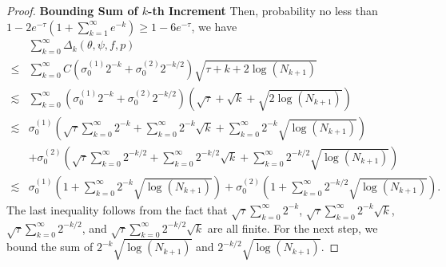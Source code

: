 \documentclass[12pt]{article}
\begin{document}
\begin{proof}
\noindent\textbf{Bounding Sum of $k$-th Increment}
Then, probability no less than $1-2e^{-\tau}(1+\sum_{k=1}^\infty e^{-k})\geq 1- 6e^{-\tau}$, we have 
\begin{align}
    &\sum_{k=0}^\infty \Delta_k(\theta,\psi,f,p)\nonumber\\
    \leq & \sum_{k=0}^\infty C(\sigma_0^{(1)}2^{-k} + \sigma_0^{(2)}2^{-k/2})\sqrt{\tau + k +2\log(N_{k+1})}\nonumber\\
    \lesssim & \sum_{k=0}^\infty (\sigma_0^{(1)}2^{-k} + \sigma_0^{(2)}2^{-k/2})\left(\sqrt{\tau} + \sqrt{k}+\sqrt{2\log(N_{k+1})}\right)\nonumber\\
    \lesssim & \sigma_0^{(1)}\left(\sqrt{\tau}\sum_{k=0}^\infty 2^{-k} + \sum_{k=0}^\infty 2^{-k}\sqrt{k}+ \sum_{k=0}^\infty 2^{-k}\sqrt{\log(N_{k+1})}\right)\nonumber\\
    &+ \sigma_0^{(2)}\left(\sqrt{\tau}\sum_{k=0}^\infty 2^{-k/2} + \sum_{k=0}^\infty 2^{-k/2}\sqrt{k}+ \sum_{k=0}^\infty 2^{-k/2}\sqrt{\log(N_{k+1})}\right)\nonumber\\
    \lesssim & \sigma_0^{(1)}\left(1+ \sum_{k=0}^\infty 2^{-k}\sqrt{\log(N_{k+1})}\right)+ \sigma_0^{(2)}\left(1+ \sum_{k=0}^\infty 2^{-k/2}\sqrt{\log(N_{k+1})}\right)\label{eq:sum_of_k_increment}.
\end{align}
The last inequality follows from the fact that $\sqrt{\tau}\sum_{k=0}^\infty 2^{-k}$, $\sqrt{\tau}\sum_{k=0}^\infty 2^{-k}\sqrt{k}$, $\sqrt{\tau}\sum_{k=0}^\infty 2^{-k/2}$, and $\sqrt{\tau}\sum_{k=0}^\infty 2^{-k/2}\sqrt{k}$ are all finite. For the next step, we bound the sum of $2^{-k}\sqrt{\log(N_{k+1})}$ and $2^{-k/2}\sqrt{\log(N_{k+1})}$.


\end{proof}
\end{document}
